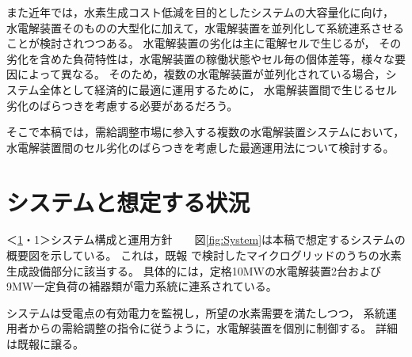 \documentclass[fleqn]{ieej}
\begin{document}
また近年では，水素生成コスト低減を目的としたシステムの大容量化に向け，
水電解装置そのものの大型化に加えて，水電解装置を並列化して系統連系させることが検討されつつある。
水電解装置の劣化は主に電解セルで生じるが，
その劣化を含めた負荷特性は，水電解装置の稼働状態やセル毎の個体差等，様々な要因によって異なる。
そのため，複数の水電解装置が並列化されている場合，システム全体として経済的に最適に運用するために，
水電解装置間で生じるセル劣化のばらつきを考慮する必要があるだろう。

そこで本稿では，需給調整市場に参入する複数の水電解装置システムにおいて，
水電解装置間のセル劣化のばらつきを考慮した最適運用法について検討する。

\vspace{-2mm}

\section{システムと想定する状況}\label{sec:system}

\vspace{-2mm}

＜\ref{sec:system}・1＞システム構成と運用方針　　図\ref{fig:System}は本稿で想定するシステムの概要図を示している。
これは，既報\cite{Nakamura_2021} で検討したマイクログリッドのうちの水素生成設備部分に該当する。
具体的には，定格10MWの水電解装置2台および9MW一定負荷の補器類が電力系統に連系されている。

システムは受電点の有効電力を監視し，所望の水素需要を満たしつつ，
系統運用者からの需給調整の指令に従うように，水電解装置を個別に制御する。
詳細は既報\cite{Nakamura_2023}に譲る。
\end{document}
